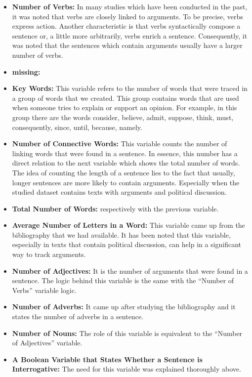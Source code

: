 \begin{itemize}

	\item \textbf{Number of Verbs:} In many studies which have been conducted in the past, it was noted that verbs are closely linked to arguments. To be precise, verbs express action. Another characteristic is that verbs syntactically compose a sentence or, a little more arbitrarily, verbs enrich a sentence. Consequently, it was noted that the sentences which contain arguments usually have a larger number of verbs.
	\item \textbf{missing:}	
	\item \textbf{Key Words:} This variable refers to the number of words that were traced in a group of words that we created. This group contains words that are used when someone tries to explain or support an opinion. For example, in this group there are the words  consider, believe, admit, suppose, think, must, consequently, since, until, because, namely.
	\item \textbf{Number of Connective Words:} This variable counts the number of linking words that were found in a sentence. In essence, this number has a direct relation to the next variable which shows the total number of words. The idea of counting the length of a sentence lies to the fact that usually, longer sentences are more likely to contain arguments. Especially when the studied dataset contains texts with arguments and political discussion.
	\item \textbf{Total Number of Words:} respectively with the previous variable.
	\item \textbf{Average Number of Letters in a Word:} This variable came up from the bibliography that we had available. It has been noted that this variable, especially in texts that contain political discussion, can help in a significant way to track arguments.
	\item \textbf{Number of Adjectives:} It is the number of arguments that were found in a sentence. The logic behind this variable is the same  with  the ``Number of Verbs'' variable logic.
	\item \textbf{Number of Adverbs:} It came up after studying the bibliography and it states the number of adverbs in a sentence.
	\item \textbf{Number of Nouns:} The role of this variable is equivalent to the ``Number of Adjectives'' variable.
	\item \textbf{A Boolean Variable that States Whether a Sentence is Interrogative:} The need for this variable was explained thoroughly above.

\end{itemize}

